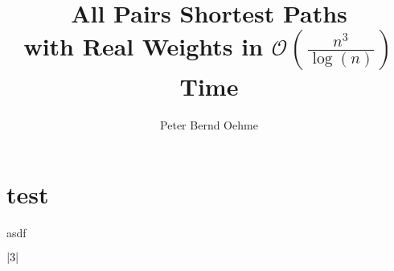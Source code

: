 

\title{All Pairs Shortest Paths \\ with Real Weights in $\mathcal{O}\left( \frac{n^3}{\log(n)} \right)$ Time}
\author{Peter Bernd Oehme}


    \maketitle

    \tableofcontents
    \clearpage

    \section{test}

    asdf~\cite{Chan2007}

    $\left\lvert3\right\rvert_{}$
